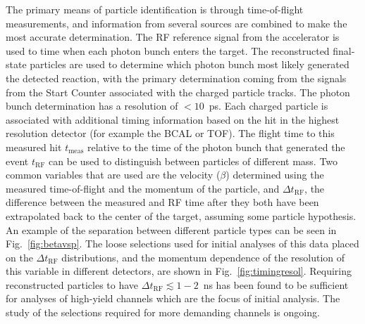 The primary means of particle identification is through time-of-flight measurements, and information from several sources are combined to make the most accurate determination.  The RF reference signal from the accelerator is used to time when each photon bunch enters the target.  The reconstructed final-state particles are used to determine which photon bunch most likely generated the detected reaction, with the primary determination coming from the signals from the Start Counter associated with the charged particle tracks.  The photon bunch determination has a resolution of $<10$~ps. Each charged particle is associated with additional timing information based on the hit in the highest resolution detector (for example the BCAL or TOF).  The flight  time to this measured hit $t_\mathrm{meas}$ relative to the time of the photon bunch that generated the event $t_\mathrm{RF}$ can be used to distinguish between particles of different mass.  Two common variables that are used are the velocity ($\beta$) determined using the measured time-of-flight and the momentum of the particle, and $\Delta t_\mathrm{RF}$, the difference between the measured and RF time after they both have been extrapolated back to the center of the target, assuming some particle hypothesis.
An example of the separation between different particle types can be seen in Fig.~\ref{fig:betavsp}.
The loose selections used for initial analyses of this data placed on the $\Delta t_\mathrm{RF}$ distributions, and the momentum dependence of the resolution of this variable in different detectors, are shown in Fig.~\ref{fig:timingresol}.  
Requiring reconstructed particles to have  $\Delta t_\mathrm{RF} \lesssim 1-2$~ns has been found to be sufficient for analyses of high-yield channels which are the focus of initial analysis.  The study of the selections required for more demanding channels is ongoing.

